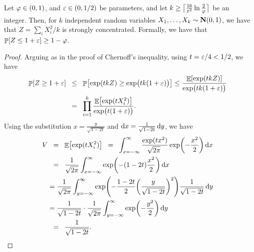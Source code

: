 \begin{lemma}
    Let $\varphi \in (0,1)$, and ${\varepsilon} \in (0,1/2)$ be parameters,
    and let
    $k \geq \left\lceil {\smash{\frac{16}{{\varepsilon}^2} \ln
          \frac{2}{\varphi}}\bigr.} \right\rceil\Bigr.$ be an integer. Then, for
    $k$ independent random variables
    $X_1, \ldots, X_k \sim \NormalY{0}{1}$, we have that
    $Z = \sum_i X_i^2/k$ is strongly concentrated. Formally, we have
    that $\Prob{ Z \leq 1+\eps} \geq 1 - \BadProb$.
\end{lemma}
\begin{proof}
    Arguing as in the proof of Chernoff's inequality, using
    $t={\varepsilon}/4<1/2$, we have
    \begin{align*}
        \Prob{Z \geq 1+\eps}%
        &\LEQ%
        \Prob{\exp(tkZ) \geq \exp\bigl( tk(1+\eps)\bigr)}
        \leq
        \frac{\Ex{\exp(tkZ)}}
        {{\exp\bigl( tk(1+\eps)\bigr)}}
        \\&%
        \EQ%
        \prod_{i=1}^k \frac{\Ex{\exp( tX_i^2) }}
        {\exp\bigl( t(1+\eps)\bigr)}.
    \end{align*}
    Using the substitution $x= \frac{y}{\sqrt{1-2t}}$ and
    $\mathop{}\!\mathrm{d}x = \frac{1}{\sqrt{1-2t}} \mathop{}\!\mathrm{d}y$, we have
    \begin{align*}
        V
        &\EQ
        \Ex{\exp( tX_i^2) }%
      \EQ%
        \int_{x=-\infty}^\infty \frac{\exp(tx^2)}{\mysqrt{2\pi}} \exp
        \pth{ -\frac{x^2}{2}} \diffX{x}%
        \\&
        \EQ%
      \frac{1}{\sqrt{2\pi}}
      \int_{x=-\infty}^\infty \exp
      \pth{ -(1-2t)\frac{x^2}{2}} \diffX{x}%
      \\&%
      =
      \frac{1}{\sqrt{2\pi}}
      \int_{y=-\infty}^{\infty}  \exp
      \pth{ -\frac{1-2t}{2}\pth{\frac{y}{\sqrt{1-2t}}}^2}
      \frac{1}{\sqrt{1-2t}}
      \diffX{y}%
      \\&
      =
      \frac{1}{\sqrt{1-2t}}
      \cdot
      \frac{1}{\sqrt{2\pi}}
      \int_{y=-\infty}^{\infty}  \exp
      \pth{ -\frac{y^2}{2} }
      \diffX{y}%
      \\&
      \EQ%
      \frac{1}{\sqrt{1-2t}}.
    \end{align*}


\end{proof}
